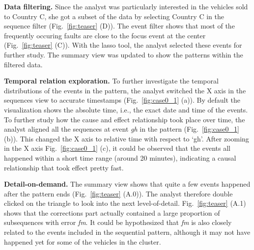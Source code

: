 \textbf{Data filtering.}  Since the analyst was particularly interested in the vehicles sold to Country C, she got a subset of the data by selecting Country C in the sequence filter (Fig.~\ref{fig:teaser} (D)). The event filter shows that most of the frequently occuring faults are close to the focus event at the center (Fig.~\ref{fig:teaser} (C)). With the lasso tool, the analyst selected these events for further study. The summary view was updated to show the patterns within the filtered data. 

\textbf{Temporal relation exploration.} To further investigate the temporal distributions of the events in the pattern, the analyst switched the X axis in the sequences view to accurate timestamps (Fig.~\ref{fig:case0_1} (a)). By default the visualization shows the absolute time, i.e., the exact date and time of the events. To further study how the cause and effect relationship took place over time, the analyst aligned all the sequences at event \textit{gh} in the pattern (Fig.~\ref{fig:case0_1} (b)). This changed the X axis to relative time with respect to `gh'.  After zooming in the X axis Fig.~\ref{fig:case0_1} (c), it could be observed that the events all happened within a short time range (around 20 minutes), indicating a causal relationship that took effect pretty fast.

\textbf{Detail-on-demand.} The summary view shows that quite a few events happened after the pattern ends  (Fig.~\ref{fig:teaser} (A.0)). The analyst therefore double clicked on the triangle to look into the next level-of-detail. Fig.~\ref{fig:teaser} (A.1) shows that the corrections part actually contained a large proportion of subsequences with error \textit{fm}. It could be hypothesized that \textit{fm} is also closely related to the events included in the sequential pattern, although it may not have happened yet for some of the vehicles in the cluster.

